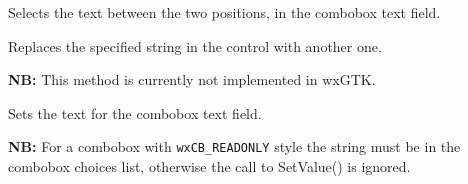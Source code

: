 Selects the text between the two positions, in the combobox text field.






\label{wxcomboboxsetstring}


Replaces the specified string in the control with another one.




{\bf NB:} This method is currently not implemented in wxGTK.

\label{wxcomboboxsetvalue}


Sets the text for the combobox text field.

{\bf NB:} For a combobox with {\tt wxCB\_READONLY} style the string must be in
the combobox choices list, otherwise the call to SetValue() is ignored.




